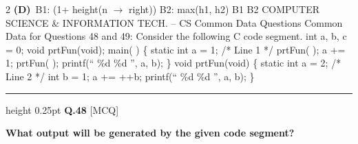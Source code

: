 \documentclass[a4paper,10pt,twoside]{article}
\begin{document}
\begin{multicols}{2}
\textbf{(D)}~B1: (1+ height(n $\to$ right)) \newline B2: max(h1, h2) \newline B1 \newline B2  COMPUTER SCIENCE \& INFORMATION TECH. -- CS \newline  \newline Common Data Questions \newline Common Data for Questions 48 and 49: \newline  \newline Consider the following C code segment. \newline int a, b, c = 0; \newline  \newline void prtFun(void); \newline main( ) \newline \{ \newline static int a = 1; /* Line 1 */ \newline  \newline prtFun( ); \newline  \newline a += 1; \newline  \newline prtFun( ); \newline  \newline printf(`` \n \%d \%d '', a, b); \newline  \newline \} \newline void prtFun(void) \newline \{ \newline static int a = 2; /* Line 2 */ \newline  \newline int b = 1; \newline a += ++b; \newline  \newline printf(`` \n \%d \%d '', a, b); \newline  \newline \}
\par\vspace{6pt}\hrule height 0.25pt\vspace{6pt}
\noindent\textbf{Q.48} \hfill {\footnotesize\textsf{[MCQ]}}
\par\vspace{2pt}
{\bfseries What output will be generated by the given code segment? \par}

\end{multicols}
\end{document}
